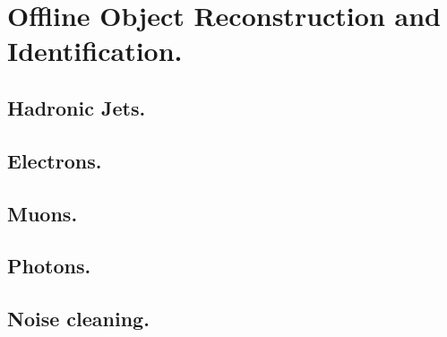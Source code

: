\chapter{Offline Object Reconstruction and Identification.} %
\label{cha:offline_object_deffinitions}

\section{Hadronic Jets.} %
\label{sec:hadronic_jets}


\section{Electrons.} %
\label{sec:electrons}


\section{Muons.} %
\label{sec:muons}


\section{Photons.} %
\label{sec:photons}


\section{Noise cleaning.} %
\label{sec:noise_cleaning_}



